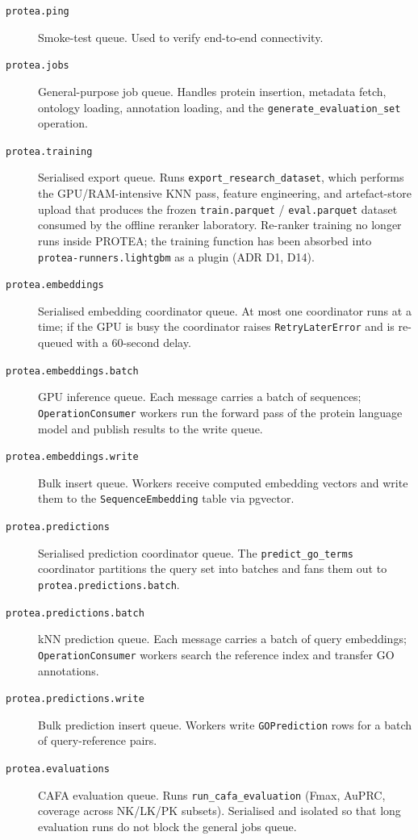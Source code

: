 \begin{description}
  \item[\texttt{protea.ping}] Smoke-test queue. Used to verify end-to-end
    connectivity.
  \item[\texttt{protea.jobs}] General-purpose job queue. Handles protein
    insertion, metadata fetch, ontology loading, annotation loading, and the
    \texttt{generate\_evaluation\_set} operation.
  \item[\texttt{protea.training}] Serialised export queue. Runs
    \texttt{export\_research\_dataset}, which performs the GPU/RAM-intensive
    KNN pass, feature engineering, and artefact-store upload that produces
    the frozen \texttt{train.parquet} / \texttt{eval.parquet} dataset consumed
    by the offline reranker laboratory. Re-ranker training no longer runs
    inside PROTEA; the training function has been absorbed into
    \texttt{protea-runners.lightgbm} as a plugin (ADR D1, D14).
  \item[\texttt{protea.embeddings}] Serialised embedding coordinator queue. At
    most one coordinator runs at a time; if the GPU is busy the coordinator
    raises \texttt{RetryLaterError} and is re-queued with a 60-second delay.
  \item[\texttt{protea.embeddings.batch}] GPU inference queue. Each message
    carries a batch of sequences; \texttt{OperationConsumer} workers run the
    forward pass of the protein language model and publish results to the
    write queue.
  \item[\texttt{protea.embeddings.write}] Bulk insert queue. Workers receive
    computed embedding vectors and write them to the \texttt{SequenceEmbedding}
    table via pgvector.
  \item[\texttt{protea.predictions}] Serialised prediction coordinator queue.
    The \texttt{predict\_go\_terms} coordinator partitions the query set into
    batches and fans them out to \texttt{protea.predictions.batch}.
  \item[\texttt{protea.predictions.batch}] kNN prediction queue. Each message
    carries a batch of query embeddings; \texttt{OperationConsumer} workers
    search the reference index and transfer GO annotations.
  \item[\texttt{protea.predictions.write}] Bulk prediction insert queue. Workers
    write \texttt{GOPrediction} rows for a batch of query-reference pairs.
  \item[\texttt{protea.evaluations}] CAFA evaluation queue. Runs
    \texttt{run\_cafa\_evaluation} (Fmax, AuPRC, coverage across NK/LK/PK
    subsets). Serialised and isolated so that long evaluation runs do not
    block the general jobs queue.
\end{description}

